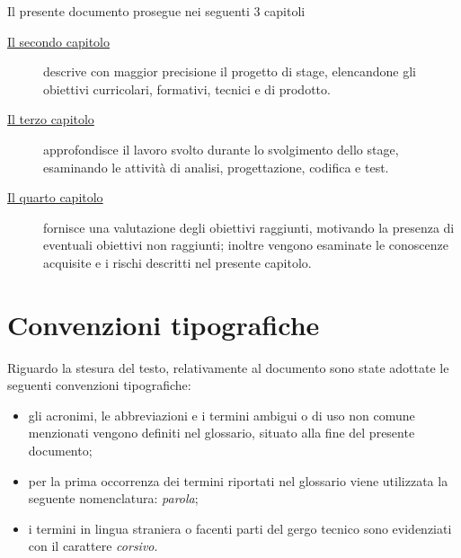 Il presente documento prosegue nei seguenti 3 capitoli
\begin{description}
    \item[{\hyperref[cap:processi-metodologie]{Il secondo capitolo}}] descrive con maggior precisione il progetto di stage, elencandone gli obiettivi curricolari, formativi, tecnici e di prodotto.

    \item[{\hyperref[cap:descrizione-stage]{Il terzo capitolo}}] approfondisce il lavoro svolto durante lo svolgimento dello stage, esaminando le attività di analisi, progettazione, codifica e test.

    \item[{\hyperref[cap:analisi-requisiti]{Il quarto capitolo}}] fornisce una valutazione degli obiettivi raggiunti, motivando la presenza di eventuali obiettivi non raggiunti; inoltre vengono esaminate le conoscenze acquisite e i rischi descritti nel presente capitolo.

\end{description}

\section{Convenzioni tipografiche}

Riguardo la stesura del testo, relativamente al documento sono state adottate le seguenti convenzioni tipografiche:
\begin{itemize}
	\item gli acronimi, le abbreviazioni e i termini ambigui o di uso non comune menzionati vengono definiti nel glossario, situato alla fine del presente documento;
	\item per la prima occorrenza dei termini riportati nel glossario viene utilizzata la seguente nomenclatura: \emph{parola}\glsfirstoccur;
	\item i termini in lingua straniera o facenti parti del gergo tecnico sono evidenziati con il carattere \emph{corsivo}.
\end{itemize}
